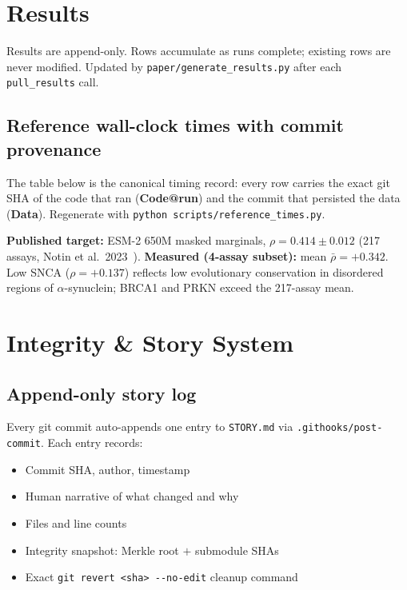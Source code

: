\documentclass[11pt,a4paper]{article}
\begin{document}
\section{Results}
\label{sec:results}

Results are append-only. Rows accumulate as runs complete;
existing rows are never modified.
Updated by \texttt{paper/generate\_results.py} after each \texttt{pull\_results} call.



\subsection{Reference wall-clock times with commit provenance}

The table below is the canonical timing record: every row carries the exact
git SHA of the code that ran (\textbf{Code@run}) and the commit that persisted
the data (\textbf{Data}).  Regenerate with \lstinline|python scripts/reference_times.py|.



\begin{infobox}
\textbf{Published target:} ESM-2 650M masked marginals,
$\rho = 0.414 \pm 0.012$ (217 assays, Notin et al.\ 2023~\cite{notin2023proteingym}).
\textbf{Measured (4-assay subset):} mean $\bar{\rho} = +0.342$.
Low SNCA ($\rho=+0.137$) reflects low evolutionary conservation in
disordered regions of $\alpha$-synuclein; BRCA1 and PRKN exceed the
217-assay mean.
\end{infobox}

\section{Integrity \& Story System}

\subsection{Append-only story log}

Every git commit auto-appends one entry to \texttt{STORY.md} via
\texttt{.githooks/post-commit}. Each entry records:

\begin{itemize}[nosep]
  \item Commit SHA, author, timestamp
  \item Human narrative of what changed and why
  \item Files and line counts
  \item Integrity snapshot: Merkle root $+$ submodule SHAs
  \item Exact \lstinline|git revert <sha> --no-edit| cleanup command
\end{itemize}
\end{document}
